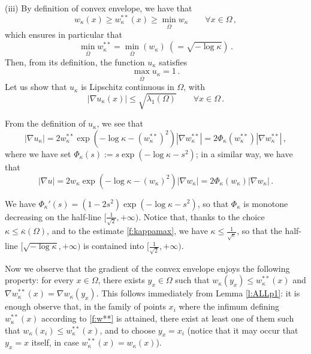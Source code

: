 \documentclass[11pt]{amsart}
\theoremstyle{definition}
\theoremstyle{remark}
\def\Om{\Omega}
\def\k{\kappa}
\begin{document}
\smallskip
(iii) By definition of convex envelope, we have  that  
$$w _ \k(x) \geq w  _\k ^ { **} (x) \geq \min _{\overline \Om}  w _\k   \qquad \forall x \in \Om \,,$$
which ensures in particular that 
\begin{equation}\label{f:minconv} \min _{\overline \Om}  w  _\k ^ { **}   = 
 \min _{\overline \Om}   (w _\k )\
  (=  \sqrt{  - \log  \k})\,.
  \end{equation}
 Then, from its definition, the function $u_\k$  satisfies 
\begin{equation} \label{f:b1} 
\max _{\overline \Om}  u _ \k   = 1  \,.\end{equation}
Let us show  that $ u_\k$ is Lipschitz continuous in $\Omega$, with 
\begin{equation} \label{f:b2} |\nabla  u_\k ( x)  | \leq \sqrt {\lambda _ 1 (\Om)} \qquad \forall x \in \Om\,.\end{equation}

From the definition of $u_\k$, we see that 
\begin{equation}\label{f:nabla} 
|\nabla  u _\k | = 2 w _\k ^ {**} \exp (  - \log \k -  ( w _\k ^ {**} ) ^ 2  ) |  \nabla w _\k ^ {**}  |  = 2 \Phi  _\k ( w _\k ^ {**} ) |  \nabla w _\k ^ {**}  | \,,
\end{equation}   
where we have set $\Phi _\k ( s) := s \exp ( - \log \k -  s^ 2  ) $; in a similar way, we have that
 \begin{equation}\label{f:nabla2} 
|\nabla  u | = 2 w _\k  \exp (  - \log \k -  ( w _\k  ) ^ 2  ) |  \nabla w _\k  |  = 2 \Phi  _\k ( w _\k  ) |  \nabla w _\k  | \,.
\end{equation}    

We have $\Phi_\k  '( s) = (1-2 s ^2)  \exp ( - \log \k -  s^ 2  ) $, so that $\Phi_\k$ is monotone decreasing on the half-line 
 $[\frac{ 1}{\sqrt 2} , + \infty)$.  Notice that, thanks to the choice $\k \leq \overline \k ( \Om)$, and to the estimate 
 \eqref{f:kappamax}, we have 
$\k \leq \frac {1}{\sqrt e}$,  so that the half-line 
 $[\sqrt{ - \log \k} , + \infty)$  is contained into
 $[\frac{ 1}{\sqrt 2} , + \infty)$. 
 

 Now we observe that the gradient of the convex envelope enjoys the following property:   
 for every $x \in \Om$, there exists 
 $y _x \in \Om$ such that $w _ \k ( y_x) \leq w _\k  ^ {**} (x)$ and 
$\nabla w _\k ^  {**} (x) = \nabla w _ \k ( y _x)$.   This follows immediately  from Lemma \ref{l:ALLp1}: it is enough  observe that, in the family of points $x_i$ where the infimum defining  $w _\k ^  {**} (x)$ according to \eqref{f:w**}   is attained, 
there exist at least one of them such that  $w _ \k ( x_i) \leq w _\k  ^ {**} (x)$, and to choose $y _ x = x_i$ 
(notice that it may occur that 
$y _x =x$ itself, in case $w _\k  ^ {**} (x) = w _\k  (x)$).
\end{document}

